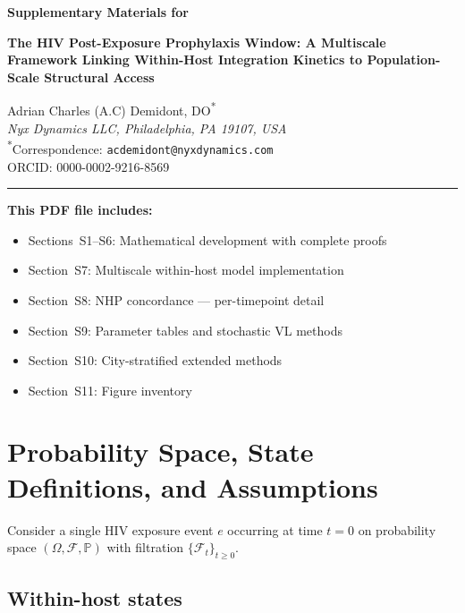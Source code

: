 \documentclass[11pt]{article}
\theoremstyle{definition}
\theoremstyle{remark}
\begin{document}
\begin{flushleft}
{\Large\bfseries Supplementary Materials for\par}
\vspace{0.3em}
{\large\bfseries The HIV Post-Exposure Prophylaxis Window:
A Multiscale Framework Linking Within-Host Integration Kinetics to Population-Scale Structural Access\par}
\vspace{0.8em}
Adrian Charles (A.C) Demidont, DO\textsuperscript{*}\\
\textit{Nyx Dynamics LLC, Philadelphia, PA 19107, USA}\\
\textsuperscript{*}Correspondence: \texttt{acdemidont@nyxdynamics.com}\\
ORCID: 0000-0002-9216-8569
\end{flushleft}

\vspace{0.5em}
\hrule
\vspace{0.5em}

\noindent\textbf{This PDF file includes:}
\begin{itemize}[leftmargin=2em,nosep]
    \item Sections~S1--S6: Mathematical development with complete proofs
    \item Section~S7: Multiscale within-host model implementation
    \item Section~S8: NHP concordance --- per-timepoint detail
    \item Section~S9: Parameter tables and stochastic VL methods
    \item Section~S10: City-stratified extended methods
    \item Section~S11: Figure inventory
\end{itemize}

\vspace{0.5em}


\section{Probability Space, State Definitions, and Assumptions}

Consider a single HIV exposure event $e$ occurring at time $t = 0$ on probability space $(\Omega, \mathcal{F}, \mathbb{P})$ with filtration $\{\mathcal{F}_{t}\}_{t \geq 0}$.

\subsection{Within-host states}
\end{document}
